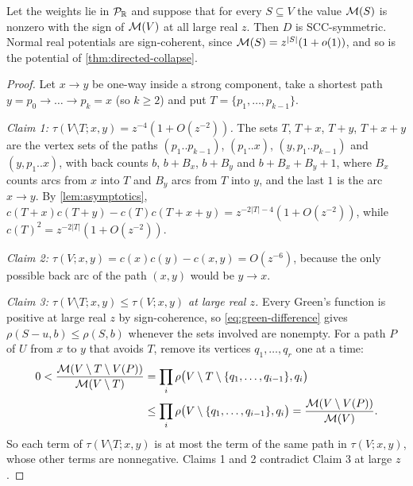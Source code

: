 \begin{corollary}\label{cor:sign-coherent}
Let the weights lie in $\mathcal{P}_{\mathbb{R}}$ and suppose that for every $S\subseteq V$ the value $\mathcal{M}(S)$ is nonzero with the sign of $\mathcal{M}(V)$ at all large real $z$. Then $D$ is SCC-symmetric. Normal real potentials are sign-coherent, since $\mathcal{M}(S)=z^{|S|}(1+o(1))$, and so is the potential of \cref{thm:directed-collapse}.
\end{corollary}
\begin{proof}
Let $x\to y$ be one-way inside a strong component, take a shortest path $y=p_0\to\dots\to p_k=x$ (so $k\ge2$) and put $T=\{p_1,\dots,p_{k-1}\}$.

\emph{Claim 1: $\tau(V\setminus T;x,y)=z^{-4}(1+O(z^{-2}))$.} The sets $T$, $T+x$, $T+y$, $T+x+y$ are the vertex sets of the paths $(p_1..p_{k-1})$, $(p_1..x)$, $(y,p_1..p_{k-1})$ and $(y,p_1..x)$, with back counts $b$, $b+B_x$, $b+B_y$ and $b+B_x+B_y+1$, where $B_x$ counts arcs from $x$ into $T$ and $B_y$ arcs from $T$ into $y$, and the last $1$ is the arc $x\to y$. By \cref{lem:asymptotics}, $c(T{+}x)c(T{+}y)-c(T)c(T{+}x{+}y)=z^{-2|T|-4}(1+O(z^{-2}))$, while $c(T)^2=z^{-2|T|}(1+O(z^{-2}))$.

\emph{Claim 2: $\tau(V;x,y)=c(x)c(y)-c(x,y)=O(z^{-6})$}, because the only possible back arc of the path $(x,y)$ would be $y\to x$.

\emph{Claim 3: $\tau(V\setminus T;x,y)\le\tau(V;x,y)$ at large real $z$.} Every Green's function is positive at large real $z$ by sign-coherence, so \eqref{eq:green-difference} gives $\rho(S-u,b)\le\rho(S,b)$ whenever the sets involved are nonempty. For a path $P$ of $U$ from $x$ to $y$ that avoids $T$, remove its vertices $q_1,\dots,q_r$ one at a time:
\begin{align*}
0<\frac{\mathcal{M}(V\setminus T\setminus V(P))}{\mathcal{M}(V\setminus T)}&=\prod_i\rho\bigl(V\setminus T\setminus\{q_1,\dots,q_{i-1}\},q_i\bigr)\\
&\le\prod_i\rho\bigl(V\setminus\{q_1,\dots,q_{i-1}\},q_i\bigr)=\frac{\mathcal{M}(V\setminus V(P))}{\mathcal{M}(V)}.
\end{align*}
So each term of $\tau(V\setminus T;x,y)$ is at most the term of the same path in $\tau(V;x,y)$, whose other terms are nonnegative. Claims 1 and 2 contradict Claim 3 at large $z$.
\end{proof}

